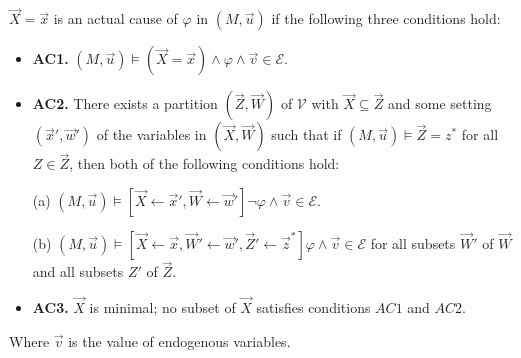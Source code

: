 \begin{definition}
    $\vec X = \vec x$ is an actual cause of $\varphi$ in $(M,\vec u)$ if the following three conditions hold:
    \begin{itemize}
        \item  \textbf{AC1.} $(M,\vec u)\models (\vec X = \vec x) \wedge \varphi \wedge \vec v \in \mathcal{E}$.
        \item  \textbf{AC2. }There exists a partition $(\vec Z, \vec W)$ of $\mathcal{V}$ with $\vec X \subseteq \vec Z$ and some setting $(\vec x',\vec w')$ of the variables in $(\vec X,\vec W)$ such that if $(M,\vec u)\models \vec Z = z^*$ for all $Z\in \vec Z$, then both of the following conditions hold:

              (a) $(M,\vec u)\models[\vec X \leftarrow \vec x', \vec W \leftarrow \vec w']\neg \varphi \wedge  \vec v \in \mathcal{E}$.

              (b) $(M,\vec u)\models[\vec X\leftarrow \vec x, \vec W' \leftarrow \vec w', \vec Z'\leftarrow \vec z^*]\varphi \wedge
                  \vec v \in \mathcal{E}$ for all subsets $\vec W'$ of $\vec W$ and all subsets $Z'$ of $\vec Z$.

        \item  \textbf{AC3.} $\vec X$ is minimal; no subset of $\vec X$ satisfies conditions $AC1$ and $AC2$.
    \end{itemize}
    Where $\vec v$ is the value of endogenous variables.
\end{definition}
